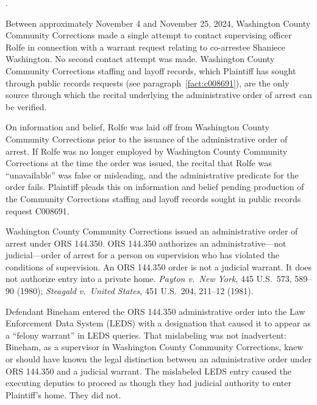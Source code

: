 \documentclass[12pt,letterpaper]{article}
\newcounter{complaintpara}
\newenvironment{paras}{%
	\begin{list}{\arabic{complaintpara}.}{%
			\setlength{\leftmargin}{0.5in}%
			\setlength{\labelwidth}{0.4in}%
			\setlength{\labelsep}{0.1in}%
			\setlength{\itemsep}{0pt}%
			\setlength{\parsep}{0pt}%
			\setlength{\topsep}{6pt}%
		}%
	}{%
	\end{list}%
}
\begin{document}
	\begin{paras}
		
		\item\label{fact:rolfe-request} Between approximately November 4
		and November 25, 2024, Washington County Community Corrections
		made a single attempt to contact supervising officer Rolfe in
		connection with a warrant request relating to co-arrestee
		Shaniece Washington. No second contact attempt was made.
		Washington County Community Corrections staffing and layoff
		records, which Plaintiff has sought through public records
		requests (see paragraph~\ref{fact:c008691}), are the only
		source through which the recital underlying the administrative
		order of arrest can be verified.
		
		\item\label{fact:rolfe-layoff} On information and belief, Rolfe
		was laid off from Washington County Community Corrections prior
		to the issuance of the administrative order of arrest. If
		Rolfe was no longer employed by Washington County Community
		Corrections at the time the order was issued, the recital that
		Rolfe was ``unavailable'' was false or misleading, and the
		administrative predicate for the order fails. Plaintiff pleads
		this on information and belief pending production of the
		Community Corrections staffing and layoff records sought in
		public records request C008691.
		
		\item\label{fact:ors144350} Washington County Community
		Corrections issued an administrative order of arrest under
		ORS 144.350. ORS 144.350 authorizes an administrative---not
		judicial---order of arrest for a person on supervision who has
		violated the conditions of supervision. An ORS 144.350 order
		is not a judicial warrant. It does not authorize entry into a
		private home. \textit{Payton v.\ New York}, 445 U.S.\ 573,
		589--90 (1980); \textit{Steagald v.\ United States},
		451 U.S.\ 204, 211--12 (1981).
		
		\item\label{fact:ledsentry} Defendant Bineham entered the
		ORS 144.350 administrative order into the Law Enforcement Data
		System (LEDS) with a designation that caused it to appear as a
		``felony warrant'' in LEDS queries. That mislabeling was not
		inadvertent: Bineham, as a supervisor in Washington County
		Community Corrections, knew or should have known the legal
		distinction between an administrative order under ORS 144.350
		and a judicial warrant. The mislabeled LEDS entry caused the
		executing deputies to proceed as though they had judicial
		authority to enter Plaintiff's home. They did not.
		

\end{paras}
\end{document}
